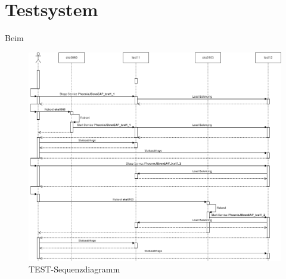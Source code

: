 
\chapter{Testsystem}
\begin{flushleft}
    Beim
    \begin{figure}[H]
        \centering
        \includegraphics[width=1\linewidth]{source/test/sequenzdiagramm_test}
        \caption{TEST-Sequenzdiagramm}
        \label{fig:test-sequenzdiagramm}
    \end{figure}
\end{flushleft}